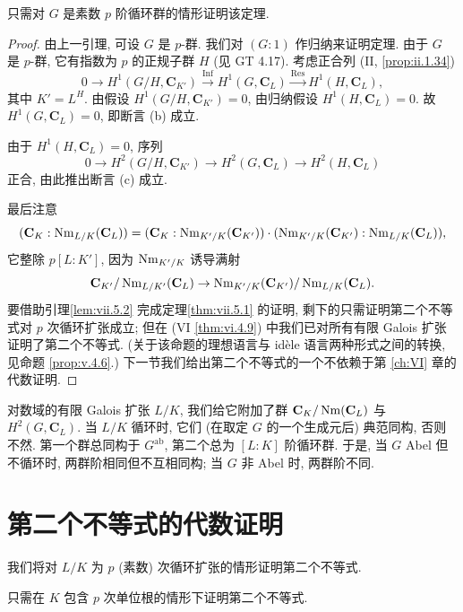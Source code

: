 \begin{lemma}\label{lem:vii.5.4}
只需对 $G$ 是素数 $p$ 阶循环群的情形证明该定理.
\end{lemma}

\begin{proof}
由上一引理, 可设 $G$ 是 $p$-群. 我们对 $(G:1)$ 作归纳来证明定理. 由于 $G$ 是 $p$-群, 它有指数为 $p$ 的正规子群 $H$ (见 GT 4.17). 考虑正合列 (II, \ref{prop:ii.1.34})
\[
0\to H^{1}(G/H,\mathbf{C}_{K'})\xrightarrow{\operatorname{Inf}}H^{1}(G,\mathbf{C}_{L})\xrightarrow{\operatorname{Res}}H^{1}(H,\mathbf{C}_{L}),
\]
其中 $K'=L^{H}$. 由假设 $H^{1}(G/H,\mathbf{C}_{K'})=0$, 由归纳假设 $H^{1}(H,\mathbf{C}_{L})=0$. 故 $H^{1}(G,\mathbf{C}_{L})=0$, 即断言 (b) 成立.

由于 $H^{1}(H,\mathbf{C}_{L})=0$, 序列
\[
0\to H^{2}(G/H,\mathbf{C}_{K'})\to H^{2}(G,\mathbf{C}_{L})\to H^{2}(H,\mathbf{C}_{L})
\]
正合, 由此推出断言 (c) 成立.

最后注意
\[
(\mathbf{C}_{K}:\operatorname{Nm}_{L/K}(\mathbf{C}_{L}))=(\mathbf{C}_{K}:\operatorname{Nm}_{K'/K}(\mathbf{C}_{K'}))\cdot(\operatorname{Nm}_{K'/K}(\mathbf{C}_{K'}):\operatorname{Nm}_{L/K}(\mathbf{C}_{L})),
\]
它整除 $p[L:K']$, 因为 $\operatorname{Nm}_{K'/K}$ 诱导满射
\[
\mathbf{C}_{K'}/\operatorname{Nm}_{L/K'}(\mathbf{C}_{L})\to\operatorname{Nm}_{K'/K}(\mathbf{C}_{K'})/\operatorname{Nm}_{L/K}(\mathbf{C}_{L}).
\]
要借助引理\ref{lem:vii.5.2} 完成定理\ref{thm:vii.5.1} 的证明, 剩下的只需证明第二个不等式对 $p$ 次循环扩张成立; 但在 (VI \ref{thm:vi.4.9}) 中我们已对所有有限 Galois 扩张证明了第二个不等式. (关于该命题的理想语言与 idèle 语言两种形式之间的转换, 见命题 \ref{prop:v.4.6}.) 下一节我们给出第二个不等式的一个不依赖于第 \ref{ch:VI} 章的代数证明.
\end{proof}

\begin{remark}\label{rem:vii.5.5}
对数域的有限 Galois 扩张 $L/K$, 我们给它附加了群 $\mathbf{C}_K/\operatorname{Nm}(\mathbf{C}_L)$ 与 $H^{2}(G,\mathbf{C}_L)$. 当 $L/K$ 循环时, 它们 (在取定 $G$ 的一个生成元后) 典范同构, 否则不然. 第一个群总同构于 $G^{\mathrm{ab}}$, 第二个总为 $[L:K]$ 阶循环群. 于是, 当 $G$ Abel 但不循环时, 两群阶相同但不互相同构; 当 $G$ 非 Abel 时, 两群阶不同.
\end{remark}

\section{第二个不等式的代数证明}\label{sec:VII.6}

我们将对 $L/K$ 为 $p$ (素数) 次循环扩张的情形证明第二个不等式.

\begin{lemma}\label{lem:vii.6.1}
只需在 $K$ 包含 $p$ 次单位根的情形下证明第二个不等式.
\end{lemma}

